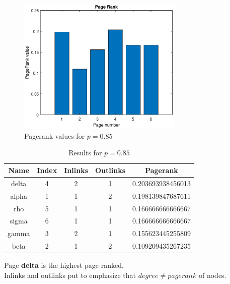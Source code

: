 \documentclass[unicode,11pt,a4paper,oneside,numbers=endperiod,openany]{scrartcl}
\begin{document}
\begin{enumerate}
          \begin{figure}[H]
              \centering
              \includegraphics[width=0.7\textwidth]{figures/ex3p2_pagerank}
              \caption{Pagerank values for $p = 0.85$}
              \label{fig:ex3_pagerank_histogram}
          \end{figure}

          \begin{table}[H]
              \centering
              \begin{tabular}{||c c c c c||}
                  \hline
                  Name  & Index & Inlinks & Outlinks & Pagerank          \\ [0.5ex]
                  \hline\hline
                  delta & 4     & 2       & 1        & 0.203693938456013 \\
                  alpha & 1     & 1       & 2        & 0.198139847687611 \\
                  rho   & 5     & 1       & 1        & 0.166666666666667 \\
                  sigma & 6     & 1       & 1        & 0.166666666666667 \\
                  gamma & 3     & 2       & 1        & 0.155623445255809 \\
                  beta  & 2     & 1       & 2        & 0.109209435267235 \\ [1ex]
                  \hline
              \end{tabular}
              \caption{Results for $p = 0.85$}
              \label{table:ex3_pagerank_table_p1}
          \end{table}

          Page \textbf{delta} is the highest page ranked. \\
          Inlinks and outlinks put to emphasize that $degree \neq pagerank$ of nodes.


\end{enumerate}
\end{document}

